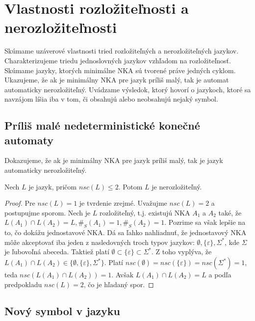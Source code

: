 \chapter[Rozložiteľnosť a nerozložiteľnosť]{Vlastnosti rozložiteľnosti a nerozložiteľnosti}
\label{kap:properties}

Skúmame uzáverové vlastnosti tried rozložiteľných a nerozložiteľných jazykov. Charakterizujeme triedu jednoslovných jazykov vzhľadom na rozložiteľnosť. Skúmame jazyky, ktorých minimálne NKA sú tvorené práve jedných cyklom. Ukazujeme, že ak je minimálny NKA pre jazyk príliš malý, tak je automat automaticky nerozložiteľný. Uvádzame výsledok, ktorý hovorí o jazykoch, ktoré sa navzájom líšia iba v tom, či obsahujú alebo neobsahujú nejaký symbol.

\section{Príliš malé nedeterministické konečné automaty}

Dokazujeme, že ak je minimálny NKA pre jazyk príliš malý, tak je jazyk automaticky nerozložiteľný.

\begin{theorem}
\label{thm:too_small_nsc}
Nech $ L $ je jazyk, pričom $ nsc(L) \leq 2 $. Potom $ L $ je nerozložiteľný.
\end{theorem}

\begin{proof}
Pre $ nsc(L) = 1 $ je tvrdenie zrejmé. Uvažujme $ nsc(L)=2 $ a postupujme sporom. Nech je $ L $ rozložiteľný, t.j. existujú NKA $ A_1 $ a $ A_2 $ také, že $ L(A_1) \cap L(A_2) = L, \#_S(A_1)=1, \#_S(A_2)=1 $. Pozrime sa však lepšie na to, čo dokážu jednostavové NKA. Dá sa ľahko nahliadnuť, že jednostavový NKA môže akceptovať iba jeden z nasledovných troch typov jazykov: $ \emptyset, \lbrace \varepsilon \rbrace, \Sigma^* $, kde $ \Sigma $ je ľubovoľná abeceda. Taktiež platí $ \emptyset \subset \lbrace \varepsilon \rbrace \subset \Sigma^* $. Z toho vyplýva, že $ L(A_1) \cap L(A_2) \in \lbrace \emptyset, \lbrace \varepsilon \rbrace, \Sigma^* \rbrace $. Platí $ nsc(\emptyset)=nsc(\lbrace \varepsilon \rbrace)=nsc(\Sigma^*)=1 $, teda $ nsc(L(A_1) \cap L(A_2))=1 $. Avšak $ L(A_1) \cap L(A_2) = L $ a podľa predpokladu $ nsc(L)=2 $, čo je hľadaný spor.
\end{proof}

\section{Nový symbol v jazyku}

